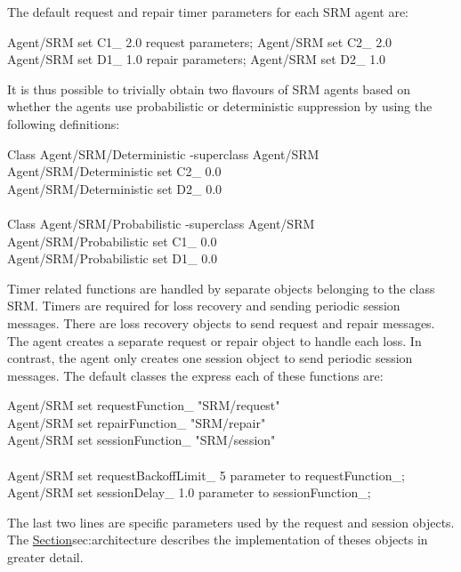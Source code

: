 \documentclass{article}
\begin{document}
The default request and repair timer parameters \cite{Floy95:Reliable}
for each SRM agent are:
\begin{program}
Agent/SRM set C1_       2.0             \; request parameters;
Agent/SRM set C2_       2.0             \\
Agent/SRM set D1_       1.0             \; repair parameters;
Agent/SRM set D2_       1.0             \\
\end{program}
It is thus possible to trivially obtain two flavours of SRM agents
based on whether the agents use probabilistic or deterministic
suppression by using the following definitions:
\begin{program}
Class Agent/SRM/Deterministic -superclass Agent/SRM     \\
Agent/SRM/Deterministic set C2_ 0.0                     \\
Agent/SRM/Deterministic set D2_ 0.0                     \\
                                                        \\
Class Agent/SRM/Probabilistic -superclass Agent/SRM     \\
Agent/SRM/Probabilistic set C1_ 0.0                     \\
Agent/SRM/Probabilistic set D1_ 0.0                     \\
\end{program}

Timer related functions are handled by separate objects
belonging to the class  SRM.
Timers are required for loss recovery and sending periodic session messages.
There are loss recovery objects to send request and repair messages.
The agent creates a separate request or repair object to handle each loss.
In contrast, the agent only creates one session object to send
periodic session messages.
The default classes the express each of these functions are:
\begin{program}
Agent/SRM set requestFunction_  "SRM/request"           \\
Agent/SRM set repairFunction_   "SRM/repair"            \\
Agent/SRM set sessionFunction_  "SRM/session"           \\
\\
Agent/SRM set requestBackoffLimit_      5   \; parameter to requestFunction_;
Agent/SRM set sessionDelay_             1.0 \; parameter to sessionFunction_;
\end{program}
The last two lines are specific parameters used by the request 
and session objects.
The \href{following section}{Section}{sec:architecture}
describes the implementation of theses objects in greater detail.
\end{document}
